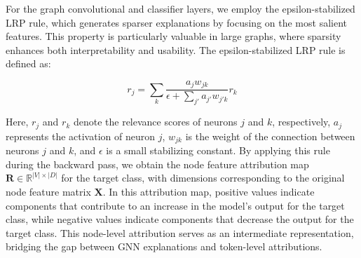 For the graph convolutional and classifier layers, we employ the epsilon-stabilized LRP rule, which generates sparser explanations by focusing on the most salient features. This property is particularly valuable in large graphs, where sparsity enhances both interpretability and usability. The epsilon-stabilized LRP rule is defined as:

\begin{equation} 
    r_j = \sum_k \frac{a_j w_{jk}}{\epsilon + \sum_{j'} a_{j'} w_{j'k}} r_k 
    \label{eq:lrp-eps} 
\end{equation}

Here, \( r_j \) and \( r_k \) denote the relevance scores of neurons \( j \) and \( k \), respectively, \( a_j \) represents the activation of neuron \( j \), \( w_{jk} \) is the weight of the connection between neurons \( j \) and \( k \), and \( \epsilon \) is a small stabilizing constant. By applying this rule during the backward pass, we obtain the node feature attribution map \( \mathbf{R} \in \mathbb{R}^{|V| \times |D|} \) for the target class, with dimensions corresponding to the original node feature matrix \( \mathbf{X} \). In this attribution map, positive values indicate components that contribute to an increase in the model's output for the target class, while negative values indicate components that decrease the output for the target class. This node-level attribution serves as an intermediate representation, bridging the gap between GNN explanations and token-level attributions.





